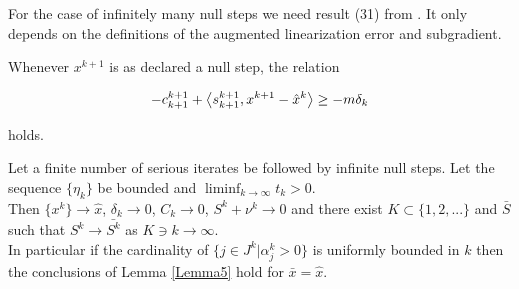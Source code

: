 
For the case of infinitely many null steps we need result (31) from \cite{Hare2016}. It only depends on the definitions of the augmented linearization error and subgradient.

Whenever \(x^{k+1}\) is as declared a null step, the relation 

\begin{equation}
	-c^{k+1}_{k+1} + \left\langle s^{k+1}_{k+1}, x^{k+1}-\hat{x}^k\right\rangle \geq -m\delta_k
\label{no_ls}
\end{equation}

holds.

\begin{theorem} 
	Let a finite number of serious iterates be followed by infinite null steps. Let the sequence \(\{\eta_k\}\) be bounded and \(\liminf_{k \to \infty} t_k > 0\). \\
	Then \(\{x^k\} \to \hat{x}\), \(\delta_k \to 0\), \(C_k \to 0\), \(S^k + \nu^k \to 0\) and there exist \(K\subset \{1,2,...\}\) and \(\bar{S}\) such that \(S^k \to \bar{S^k}\) as \(K \ni k \to \infty\). \\
	In particular if the cardinality of \(\{j \in J^k|\alpha_j^k > 0 \}\) is uniformly bounded in \(k\) then the conclusions of Lemma \ref{Lemma5} hold for \(\bar{x} = \hat{x}\). 
\end{theorem}

